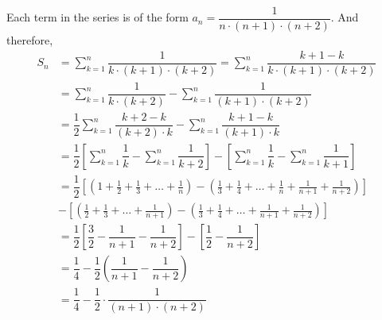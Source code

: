 \begin{solution}[\fullpage]
	\begin{fullwidth}
	Each term in the series is of the form $a_n = \dfrac{1}{n\cdot(n+1)\cdot(n+2)}$. And therefore,
	\begin{align}
		S_n &= \sum_{k=1}^{n}\dfrac{1}{k\cdot(k+1)\cdot(k+2)} 
		= \sum_{k=1}^{n}\dfrac{k+1-k}{k\cdot(k+1)\cdot(k+2)} \\
		&= \sum_{k=1}^{n}\dfrac{1}{k\cdot(k+2)} - \sum_{k=1}^{n}\dfrac{1}{(k+1)\cdot(k+2)} \\
		&= \dfrac{1}{2}\sum_{k=1}^{n}\dfrac{k+2-k}{(k+2)\cdot k} - \sum_{k=1}^{n}\dfrac{k+1-k}{(k+1)\cdot k} \\
		&= \dfrac{1}{2}\left[\sum_{k=1}^{n}\dfrac{1}{k} - \sum_{k=1}^{n}\dfrac{1}{k+2} \right] 
		- \left[ \sum_{k=1}^{n}\dfrac{1}{k} - \sum_{k=1}^{n}\dfrac{1}{k+1} \right] \\
		&= \dfrac{1}{2}\left[\left(1 + \frac{1}{2} + \frac{1}{3} + \ldots + \frac{1}{n} \right) 
		- \left( \frac{1}{3} + \frac{1}{4} + \ldots + \frac{1}{n} + \frac{1}{n+1} + \frac{1}{n+2}\right) 
		\right] \nonumber \\
		&- \left[\left( \frac{1}{2} + \frac{1}{3} + \ldots + \frac{1}{n+1}\right) 
		- \left( \frac{1}{3} + \frac{1}{4} + \ldots + \frac{1}{n+1} + \frac{1}{n+2} \right) \right]  \\
		&= \dfrac{1}{2}\left[ \dfrac{3}{2} - \dfrac{1}{n+1} - \dfrac{1}{n+2}\right] 
		- \left[\dfrac{1}{2} - \dfrac{1}{n+2} \right] \\
		&= \dfrac{1}{4} - \dfrac{1}{2}\left( \dfrac{1}{n+1} - \dfrac{1}{n+2}\right) \\
		&= \dfrac{1}{4} - \dfrac{1}{2}\cdot\dfrac{1}{(n+1)\cdot(n+2)}
	\end{align}
	\end{fullwidth}
\end{solution}
